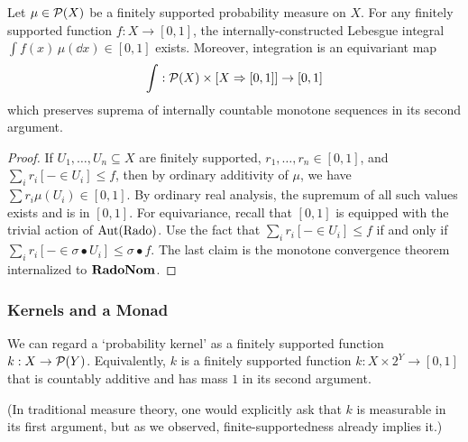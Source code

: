 \begin{proposition}\label{prop:internal-integration}
  Let $\mu\in \mathcal{P} (X)$ be a finitely supported probability measure
  on $X$.
  For any finitely supported function $f\colon X\to [0,1]$,
  the internally-constructed Lebesgue integral $\int f(x)\,\mu(\dd x) \in [0,1]$ exists.
  Moreover, integration is an equivariant map
  \[
    \int : \mathcal{P} (X)\times [X\Rightarrow [0,1]]\to [0,1]
  \]
  which preserves suprema of internally countable monotone sequences in its second argument.
  \end{proposition}
  \begin{proof}
    If $U_1,\ldots,U_n \subseteq X$ are finitely supported, $r_1,\ldots,r_n \in [0,1]$, and $\sum_i r_i [- \in U_i] \leq f$, then by ordinary additivity of $\mu$, we have $\sum r_i \mu(U_i) \in [0,1]$.
    By ordinary real analysis, the supremum of all such values exists and is in $[0,1]$.
    For equivariance, recall that $[0,1]$ is equipped with the trivial action of $\operatorname{Aut}(\mathrm{Rado})$. Use the fact that $\sum_i r_i [- \in U_i] \leq f$ if and only if $\sum_i r_i [- \in \sigma\bullet U_i] \leq \sigma \bullet f$.
    The last claim is the monotone convergence theorem internalized to $\mathbf{RadoNom}$.
  \end{proof}

\subsubsection{Kernels and a Monad}
  We can regard a `probability kernel' as a finitely supported function
  $k:X\to \mathcal{P} (Y)$. Equivalently, $k$ is a finitely supported function
  $k:X\times 2^Y\to[0,1]$ that is countably additive and has mass $1$ in its second
  argument. 

  (In traditional measure theory, one would explicitly ask that $k$ is measurable
  in its first argument, but as we observed, finite-supportedness already implies it.)
  
